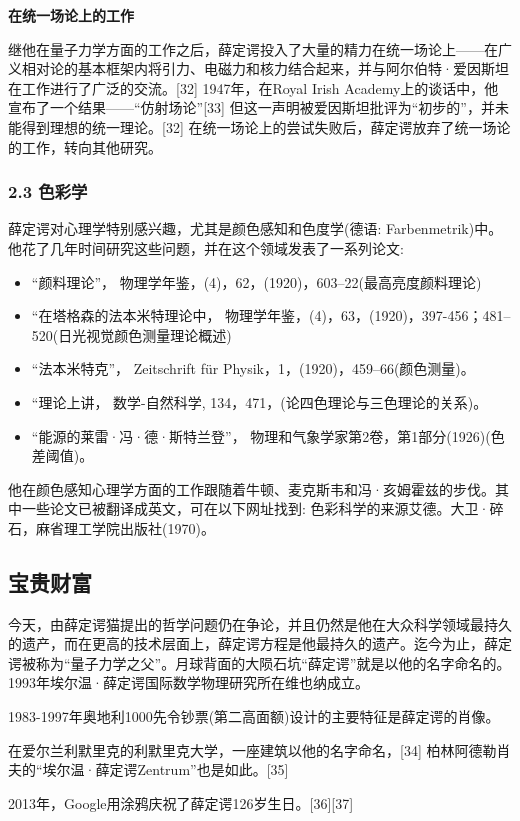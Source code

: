 \textbf{在统一场论上的工作}

继他在量子力学方面的工作之后，薛定谔投入了大量的精力在统一场论上——在广义相对论的基本框架内将引力、电磁力和核力结合起来，并与阿尔伯特·爱因斯坦在工作进行了广泛的交流。[32] 1947年，在Royal Irish Academy上的谈话中，他宣布了一个结果——“仿射场论”[33] 但这一声明被爱因斯坦批评为“初步的”，并未能得到理想的统一理论。[32] 在统一场论上的尝试失败后，薛定谔放弃了统一场论的工作，转向其他研究。

\subsubsection{2.3 色彩学}
薛定谔对心理学特别感兴趣，尤其是颜色感知和色度学(德语: Farbenmetrik)中。他花了几年时间研究这些问题，并在这个领域发表了一系列论文:
\begin{itemize}
\item “颜料理论”， 物理学年鉴，(4)，62，(1920)，603–22(最高亮度颜料理论)
\item “在塔格森的法本米特理论中， 物理学年鉴，(4)，63，(1920)，397-456；481–520(日光视觉颜色测量理论概述)
\item “法本米特克”， Zeitschrift für Physik，1，(1920)，459–66(颜色测量)。
\item “理论上讲， 数学-自然科学, 134，471，(论四色理论与三色理论的关系)。
\item “能源的莱雷·冯·德·斯特兰登”， 物理和气象学家第2卷，第1部分(1926)(色差阈值)。
\end{itemize}

他在颜色感知心理学方面的工作跟随着牛顿、麦克斯韦和冯·亥姆霍兹的步伐。其中一些论文已被翻译成英文，可在以下网址找到: 色彩科学的来源艾德。大卫·碎石，麻省理工学院出版社(1970)。

\subsection{宝贵财富}
今天，由薛定谔猫提出的哲学问题仍在争论，并且仍然是他在大众科学领域最持久的遗产，而在更高的技术层面上，薛定谔方程是他最持久的遗产。迄今为止，薛定谔被称为“量子力学之父”。月球背面的大陨石坑“薛定谔”就是以他的名字命名的。1993年埃尔温·薛定谔国际数学物理研究所在维也纳成立。

1983-1997年奥地利1000先令钞票(第二高面额)设计的主要特征是薛定谔的肖像。

在爱尔兰利默里克的利默里克大学，一座建筑以他的名字命名，[34] 柏林阿德勒肖夫的“埃尔温·薛定谔Zentrum”也是如此。[35]

2013年，Google用涂鸦庆祝了薛定谔126岁生日。[36][37]

